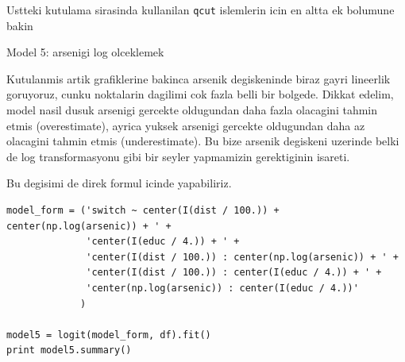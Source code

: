\documentclass[12pt,fleqn]{article}\usepackage{../common}
\begin{document}
Ustteki kutulama sirasinda kullanilan \verb!qcut! islemlerin
icin en altta ek bolumune bakin

Model 5: arsenigi log olceklemek

Kutulanmis artik grafiklerine bakinca arsenik degiskeninde biraz gayri
lineerlik goruyoruz, cunku noktalarin dagilimi cok fazla belli bir
bolgede. Dikkat edelim, model nasil dusuk arsenigi gercekte oldugundan
daha fazla olacagini tahmin etmis (overestimate), ayrica yuksek
arsenigi gercekte oldugundan daha az olacagini tahmin etmis
(underestimate). Bu bize arsenik degiskeni uzerinde belki de log
transformasyonu gibi bir seyler yapmamizin gerektiginin isareti.

Bu degisimi de direk formul icinde yapabiliriz.

\begin{verbatim}
model_form = ('switch ~ center(I(dist / 100.)) + center(np.log(arsenic)) + ' +
              'center(I(educ / 4.)) + ' +
              'center(I(dist / 100.)) : center(np.log(arsenic)) + ' + 
              'center(I(dist / 100.)) : center(I(educ / 4.)) + ' + 
              'center(np.log(arsenic)) : center(I(educ / 4.))'
             )

model5 = logit(model_form, df).fit()
print model5.summary()
\end{verbatim}
\end{document}
